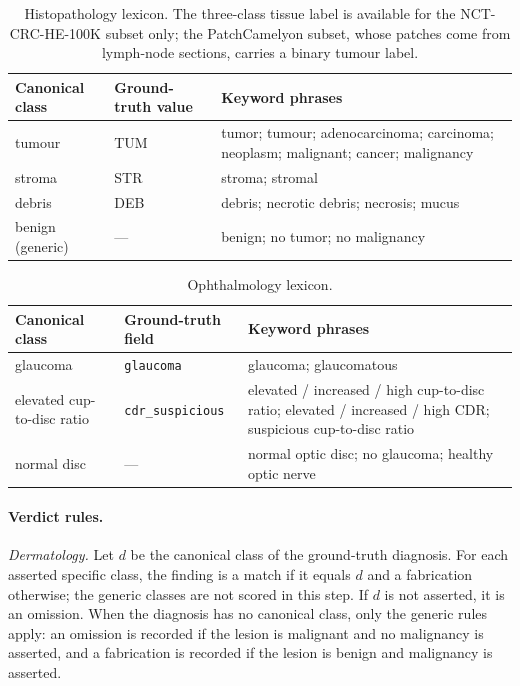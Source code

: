 \documentclass[11pt,a4paper]{article}
\begin{document}
\begin{appendices}
\begin{table}[tbp]
\centering
\caption{Histopathology lexicon. The three-class tissue label is available for the NCT-CRC-HE-100K subset only; the PatchCamelyon subset, whose patches come from lymph-node sections, carries a binary tumour label.}
\label{tab:lex_histo}
\small
\begin{tabular}{@{}p{2.6cm}p{2.6cm}p{8cm}@{}}
\toprule
Canonical class & Ground-truth value & Keyword phrases \\
\midrule
tumour & TUM & tumor; tumour; adenocarcinoma; carcinoma; neoplasm; malignant; cancer; malignancy \\
stroma & STR & stroma; stromal \\
debris & DEB & debris; necrotic debris; necrosis; mucus \\
benign (generic) & --- & benign; no tumor; no malignancy \\
\bottomrule
\end{tabular}
\end{table}

\begin{table}[tbp]
\centering
\caption{Ophthalmology lexicon.}
\label{tab:lex_ophth}
\small
\begin{tabular}{@{}p{3cm}p{3.2cm}p{7cm}@{}}
\toprule
Canonical class & Ground-truth field & Keyword phrases \\
\midrule
glaucoma & \texttt{glaucoma} & glaucoma; glaucomatous \\
elevated cup-to-disc ratio & \texttt{cdr\_suspicious} & elevated / increased / high cup-to-disc ratio; elevated / increased / high CDR; suspicious cup-to-disc ratio \\
normal disc & --- & normal optic disc; no glaucoma; healthy optic nerve \\
\bottomrule
\end{tabular}
\end{table}

\paragraph{Verdict rules.}
\emph{Dermatology.} Let $d$ be the canonical class of the ground-truth diagnosis. For each asserted specific class, the finding is a match if it equals $d$ and a fabrication otherwise; the generic classes are not scored in this step. If $d$ is not asserted, it is an omission. When the diagnosis has no canonical class, only the generic rules apply: an omission is recorded if the lesion is malignant and no malignancy is asserted, and a fabrication is recorded if the lesion is benign and malignancy is asserted.


\end{appendices}
\end{document}
